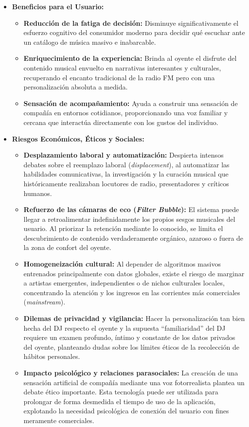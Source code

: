 \documentclass[12pt,a4paper]{article}
\begin{document}
\begin{itemize}
    \item \textbf{Beneficios para el Usuario:}
    \begin{itemize}
        \item \textbf{Reducción de la fatiga de decisión:} Disminuye significativamente el esfuerzo cognitivo del consumidor moderno para decidir qué escuchar ante un catálogo de música masivo e inabarcable.
        \item \textbf{Enriquecimiento de la experiencia:} Brinda al oyente el disfrute del contenido musical envuelto en narrativas interesantes y culturales, recuperando el encanto tradicional de la radio FM pero con una personalización absoluta a medida.
        \item \textbf{Sensación de acompañamiento:} Ayuda a construir una sensación de compañía en entornos cotidianos, proporcionando una voz familiar y cercana que interactúa directamente con los gustos del individuo.
    \end{itemize}
    
    \item \textbf{Riesgos Económicos, Éticos y Sociales:}
    \begin{itemize}
        \item \textbf{Desplazamiento laboral y automatización:} Despierta intensos debates sobre el reemplazo laboral (\textit{displacement}), al automatizar las habilidades comunicativas, la investigación y la curación musical que históricamente realizaban locutores de radio, presentadores y críticos humanos.
        \item \textbf{Refuerzo de las cámaras de eco (\textit{Filter Bubble}):} El sistema puede llegar a retroalimentar indefinidamente los propios sesgos musicales del usuario. Al priorizar la retención mediante lo conocido, se limita el descubrimiento de contenido verdaderamente orgánico, azaroso o fuera de la zona de confort del oyente.
        \item \textbf{Homogeneización cultural:} Al depender de algoritmos masivos entrenados principalmente con datos globales, existe el riesgo de marginar a artistas emergentes, independientes o de nichos culturales locales, concentrando la atención y los ingresos en las corrientes más comerciales (\textit{mainstream}).
        \item \textbf{Dilemas de privacidad y vigilancia:} Hacer la personalización tan bien hecha del DJ respecto el oyente y la supuesta ``familiaridad'' del DJ requiere un examen profundo, íntimo y constante de los datos privados del oyente, planteando dudas sobre los límites éticos de la recolección de hábitos personales.
        \item \textbf{Impacto psicológico y relaciones parasociales:} La creación de una sensación artificial de compañía mediante una voz fotorrealista plantea un debate ético importante. Esta tecnología puede ser utilizada para prolongar de forma desmedida el tiempo de uso de la aplicación, explotando la necesidad psicológica de conexión del usuario con fines meramente comerciales.
    \end{itemize}
\end{itemize}
\end{document}
